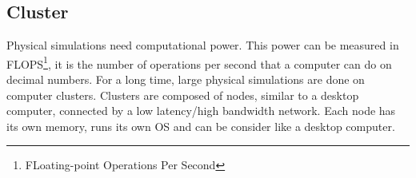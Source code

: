 \subsection{Cluster}
Physical simulations need computational power.
%
This power can be measured in FLOPS\footnote{FLoating-point Operations Per Second}, it is the number of operations per second that a computer can do on decimal numbers.
%
For a long time, large physical simulations are done on computer clusters.
%
Clusters are composed of nodes, similar to a desktop computer, connected by a low latency/high bandwidth network.
%
Each node has its own memory, runs its own OS and can be consider like a desktop computer.

